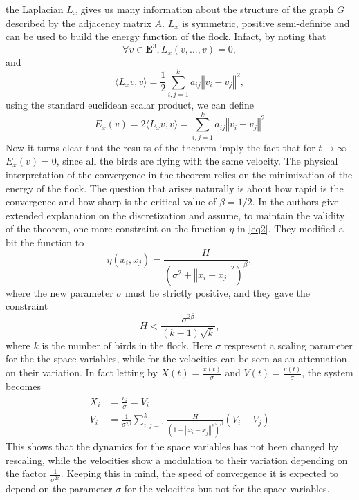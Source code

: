 \documentclass{article} %
\newcounter{math}
\begin{document}
the Laplacian $L_x$ gives us many information about the structure of the graph $G$ described
by the adjacency matrix $A$. $L_x$ is symmetric, positive semi-definite and can be used to 
build the energy function of the flock. Infact, by noting that
\begin{equation}
	\label{eq6}
	\forall v \in \mathbf{E}^3, L_x(v,...,v)=0,
\end{equation} and
\begin{equation}
	\label{eq7}
	\langle L_xv,v\rangle=\frac{1}{2}\sum_{i,j=1}^ka_{ij}\left\Vert v_i - v_j\right\Vert^2,
\end{equation}
using the standard euclidean scalar product, we can define 
\begin{equation}
	\label{eq8}
	E_x(v)=2\langle L_xv,v\rangle=\sum_{i,j=1}^ka_{ij}\left\Vert v_i - v_j\right\Vert^2
\end{equation}
Now it turns clear that the results of the theorem imply the fact that for $t\rightarrow\infty$ $E_x(v)=0$,
since all the birds are flying with the same velocity. The physical interpretation of the 
convergence in the theorem relies on the minimization of the energy of the flock. The question that
arises naturally is about how rapid is the convergence and how sharp is the critical value of $\beta=1/2$.
In \cite{CuckerSmale1} the authors give extended explanation on the 
discretization and assume, to maintain the validity of the theorem, one more constraint on
the function $\eta$ in \eqref{eq2}. They modified a bit the function to 
\begin{equation}
	\label{eq9}
	\eta(x_i,x_j)=\frac{H}{(\sigma^2+\left\Vert x_i - x_j \right\Vert^2)^{\beta}},
\end{equation}
where the new parameter $\sigma$ must be strictly positive, and they gave the constraint
\begin{equation}
	\label{eq10}
	H<\frac{\sigma^{2\beta}}{(k-1)\sqrt{k}},
\end{equation}
where $k$ is the number of birds in the flock.
Here $\sigma$ respresent a scaling parameter for the the space variables, while for the velocities
can be seen as an attenuation on their variation. In fact letting by $X(t)=\frac{x(t)}{\sigma}$ 
and $V(t)=\frac{v(t)}{\sigma}$, the system becomes
\begin{align}
\label{eq11}
    \dot{X_i} &= \frac{v_i}{\sigma} = V_i\\
    \dot{V_i} &= \frac{1}{\sigma^{2\beta}}\sum_{i,j=1}^k\frac{H}{(1+\left\Vert x_i - x_j \right\Vert^2)^{\beta}}(V_i - V_j)\nonumber
\end{align}
This shows that the dynamics for the space variables has not been changed by rescaling, while
the velocities show a modulation to their variation depending on the factor $\frac{1}{\sigma^{2\beta}}$.
Keeping this in mind, the speed of convergence it is expected to depend on the parameter $\sigma$ for the
velocities but not for the space variables.
\end{document}
